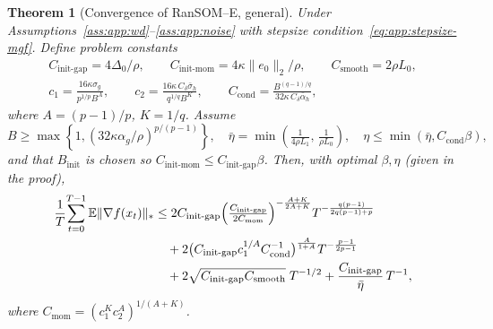 \documentclass{article}
\theoremstyle{plain}
\newtheorem{theorem}{Theorem}[section]
\theoremstyle{definition}
\theoremstyle{remark}
\begin{document}
\begin{theorem}[Convergence of RanSOM--E, general]
\label{thm:app:conv-e}
Under Assumptions~\ref{ass:app:wd}--\ref{ass:app:noise} with stepsize
condition~\eqref{eq:app:stepsize-mgf}. Define problem constants
\begin{gather*}
  C_{\mathrm{init\text{-}gap}} = 4\Delta_0/\rho, \qquad
  C_{\mathrm{init\text{-}mom}} = 4\kappa\|e_0\|_2/\rho, \qquad
  C_{\mathrm{smooth}} = 2\rho L_0, \\
  c_1 = \frac{16\kappa\sigma_g}{p^{1/p} B^A}, \qquad
  c_2 = \frac{16\kappa\, C_\delta\bar\sigma_h}{q^{1/q} B^K}, \qquad
  C_{\mathrm{cond}} = \frac{B^{(q-1)/q}}{32\kappa\, C_\delta\bar\alpha_h},
\end{gather*}
where $A = (p-1)/p$, $K = 1/q$. Assume
\begin{equation}
  B \geq \max\!\left\{1, (32\kappa\alpha_g/\rho)^{p/(p-1)}\right\},
  \quad
  \bar\eta = \min\!\left(\tfrac{1}{4\rho L_1},\, \tfrac{1}{\rho L_0}\right),
  \quad
  \eta \leq \min(\bar\eta, C_{\mathrm{cond}}\beta),
  \label{eq:app:stepsize-constraints}
\end{equation}
and that $B_{\mathrm{init}}$ is chosen so $C_{\mathrm{init\text{-}mom}} \leq
C_{\mathrm{init\text{-}gap}}\beta$. Then, with optimal $\beta, \eta$
(given in the proof),
\begin{align}
  \frac{1}{T}\!\sum_{t=0}^{T-1}\mathbb{E}\|\nabla f(x_t)\|_*
  &\leq 2C_{\mathrm{init\text{-}gap}}\!\left(\tfrac{C_{\mathrm{init\text{-}gap}}}{2C_{\mathrm{mom}}}\right)^{-\frac{A+K}{2A+K}}\!
      T^{-\frac{q(p-1)}{2q(p-1)+p}}
  \notag\\
  &\quad + 2\bigl(C_{\mathrm{init\text{-}gap}} c_1^{1/A} C_{\mathrm{cond}}^{-1}\bigr)^{\frac{A}{1+A}} T^{-\frac{p-1}{2p-1}}
  \notag\\
  &\quad + 2\sqrt{C_{\mathrm{init\text{-}gap}} C_{\mathrm{smooth}}}\; T^{-1/2}
    + \frac{C_{\mathrm{init\text{-}gap}}}{\bar\eta}\, T^{-1},
  \label{eq:app:conv-e}
\end{align}
where $C_{\mathrm{mom}} = (c_1^K c_2^A)^{1/(A+K)}$.
\end{theorem}
\end{document}
